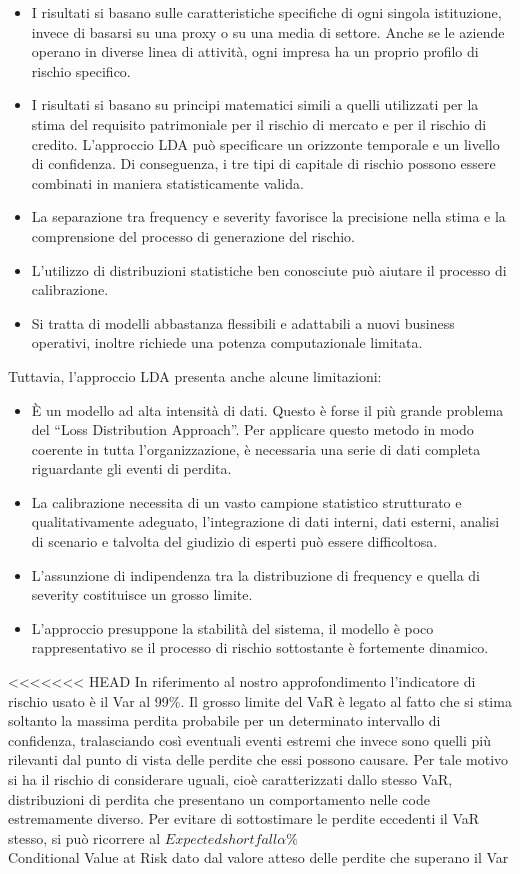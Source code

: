 \documentclass[titlepage]{article}
\begin{document}
\begin{itemize}
{\begin{itemize}
	\item 	I risultati si basano sulle caratteristiche specifiche di ogni singola istituzione, invece di basarsi su una proxy o su una media di settore. Anche se le aziende operano in diverse linea di attività, ogni impresa ha un proprio profilo di rischio specifico.  
	\item 	I risultati si basano su principi matematici simili a quelli utilizzati per la stima del requisito patrimoniale per il rischio di mercato e per il rischio di credito. L'approccio LDA può specificare un orizzonte temporale e un livello di confidenza. Di conseguenza, i tre tipi di capitale di rischio possono essere combinati in maniera statisticamente valida.  
	\item 	La separazione tra frequency e severity favorisce la precisione nella stima e la comprensione del processo di generazione del rischio.  
	\item 	L’utilizzo di distribuzioni statistiche ben conosciute può aiutare il processo di calibrazione.  
	\item 	Si tratta di modelli abbastanza flessibili e adattabili a nuovi business operativi, inoltre richiede una potenza computazionale limitata.
\end{itemize}
	 Tuttavia, l'approccio LDA presenta anche alcune limitazioni: 
	\begin{itemize}
	\item 	È un modello ad alta intensità di dati. Questo è forse il più grande problema del “Loss Distribution Approach”. Per applicare questo metodo in modo coerente in tutta l'organizzazione, è necessaria una serie di dati completa riguardante gli eventi di perdita.  
	\item La calibrazione necessita di un vasto campione statistico strutturato e qualitativamente adeguato, l’integrazione di dati interni, dati esterni, analisi di scenario e talvolta del giudizio di esperti può essere difficoltosa.  
	\item 	L’assunzione di indipendenza tra la distribuzione di frequency e quella di severity costituisce un grosso limite.  
	\item 	L’approccio presuppone la stabilità del sistema, il modello è poco rappresentativo se il processo di rischio sottostante è fortemente dinamico. 
\end{itemize}
<<<<<<< HEAD
In riferimento al nostro approfondimento l’indicatore di rischio usato è il Var al 99\%. Il grosso limite del VaR è legato al fatto che si stima soltanto la massima perdita probabile per un determinato intervallo di confidenza, tralasciando così eventuali eventi estremi che invece sono quelli più rilevanti dal punto di vista delle perdite che essi possono causare. Per tale motivo si ha il rischio di considerare uguali, cioè caratterizzati dallo stesso VaR, distribuzioni di perdita che presentano un comportamento nelle code estremamente diverso. Per evitare di sottostimare le perdite eccedenti il VaR stesso, si può ricorrere al $Expected shortfall\alpha\%$ \\  Conditional Value at Risk dato dal valore atteso delle perdite che superano il Var
}
\end{itemize}
\end{document}
